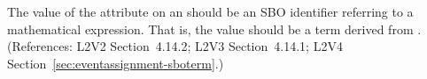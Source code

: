 The value of the  attribute on an \EventAssignment should be an
SBO identifier referring to a mathematical expression.  That is, the value
should be a term derived from \sbomathformula.  (References: L2V2 Section~4.14.2;
L2V3 Section~4.14.1; L2V4 Section~\ref{sec:eventassignment-sboterm}.)
